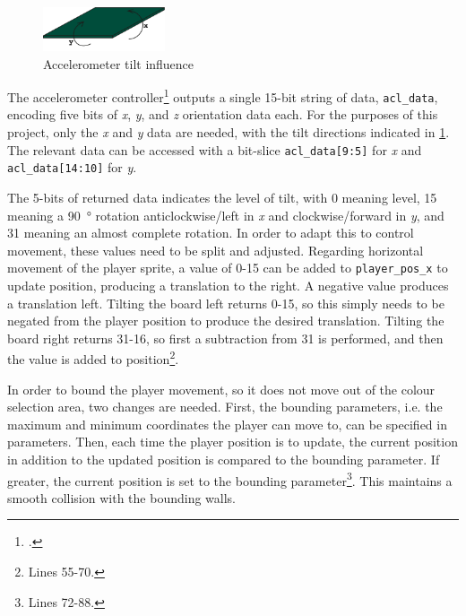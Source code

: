 \begin{figure}
    \vspace{-11pt}
    \begin{center}
        \includegraphics[width=0.32\textwidth]{figures/boardtilt.png}
        \caption{Accelerometer tilt influence}\label{fig:acltilt}
    \end{center}
\end{figure}

The accelerometer controller\footnote{
    .
} outputs a single 15-bit string of data, \lstinline|acl_data|, encoding five bits of \emph{x}, \emph{y},
and \emph{z} orientation data each. For the purposes of this project, only the \emph{x} and \emph{y} 
data are needed, with the tilt directions indicated in \cref{fig:acltilt}. The relevant data can 
be accessed with a bit-slice \lstinline|acl_data[9:5]| for \emph{x} and \lstinline|acl_data[14:10]|
for \emph{y}. 

The 5-bits of returned data indicates the level of tilt, with 0 meaning level, 15 meaning a \qty{90}{\degree}
rotation anticlockwise/left in \emph{x} and clockwise/forward in \emph{y}, and 31 meaning an almost complete rotation.
In order to adapt this to control movement, these values need to be split and adjusted. 
Regarding horizontal movement of the player sprite, a value of 0-15 can be added to \lstinline{player_pos_x} 
to update position, producing a translation to the right. A negative value produces a translation left. 
Tilting the board left returns 0-15, so this simply needs to be negated from the player position to produce
the desired translation. Tilting the board right returns 31-16, so first a subtraction from 31 is performed,
and then the value is added to position\footnote{
    Lines 55-70.
}. 

In order to bound the player movement, so it does not move out of the colour selection area, two changes are needed. 
First, the bounding parameters, i.e. the maximum and minimum coordinates the player can move to, can be specified 
in parameters. Then, each time the player position is to update, the current position in addition to the updated position 
is compared to the bounding parameter. If greater, the current position is set to the bounding parameter\footnote{
    Lines 72-88.
}.  
This maintains a smooth collision with the bounding walls. 


